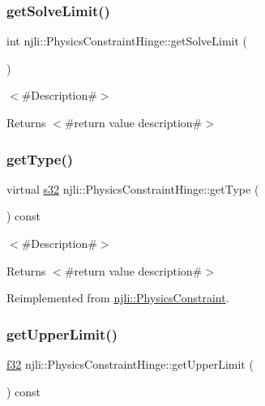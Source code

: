 \subsubsection{\texorpdfstring{get\+Solve\+Limit()}{getSolveLimit()}}
{\footnotesize\ttfamily int njli\+::\+Physics\+Constraint\+Hinge\+::get\+Solve\+Limit (\begin{DoxyParamCaption}{ }\end{DoxyParamCaption})}

$<$\#\+Description\#$>$

\begin{DoxyReturn}{Returns}
$<$\#return value description\#$>$ 
\end{DoxyReturn}
\mbox{\label{classnjli_1_1_physics_constraint_hinge_ae31ea0358f051f773a4f06b52f6c92ff}} 
\subsubsection{\texorpdfstring{get\+Type()}{getType()}}
{\footnotesize\ttfamily virtual \mbox{\hyperlink{_util_8h_aa62c75d314a0d1f37f79c4b73b2292e2}{s32}} njli\+::\+Physics\+Constraint\+Hinge\+::get\+Type (\begin{DoxyParamCaption}{ }\end{DoxyParamCaption}) const\hspace{0.3cm}{\ttfamily [virtual]}}

$<$\#\+Description\#$>$

\begin{DoxyReturn}{Returns}
$<$\#return value description\#$>$ 
\end{DoxyReturn}


Reimplemented from \mbox{\hyperlink{classnjli_1_1_physics_constraint_a3234aefaf2706165fbc52b5b37c05888}{njli\+::\+Physics\+Constraint}}.

\mbox{\label{classnjli_1_1_physics_constraint_hinge_a5e2573f9accfd604270b48ee0b9e1cf4}} 
\subsubsection{\texorpdfstring{get\+Upper\+Limit()}{getUpperLimit()}}
{\footnotesize\ttfamily \mbox{\hyperlink{_util_8h_a5f6906312a689f27d70e9d086649d3fd}{f32}} njli\+::\+Physics\+Constraint\+Hinge\+::get\+Upper\+Limit (\begin{DoxyParamCaption}{ }\end{DoxyParamCaption}) const}

